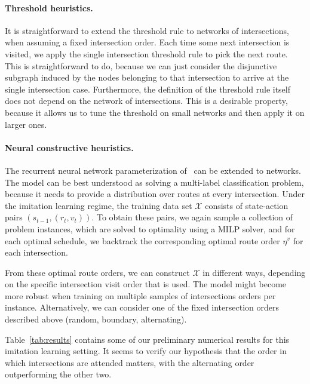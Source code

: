 \documentclass{report}
\theoremstyle{definition}
\theoremstyle{plain}
\begin{document}
\paragraph{Threshold heuristics.}
It is straightforward to extend the threshold rule to networks of
intersections, when assuming a fixed intersection order. Each time some
next intersection is visited, we apply the single intersection threshold rule to
pick the next route. This is straightforward to do, because we can just consider
the disjunctive subgraph induced by the nodes belonging to that intersection to
arrive at the single intersection case.
%
Furthermore, the definition of the threshold rule itself does not depend on the
network of intersections. This is a desirable property, because it allows us to
tune the threshold on small networks and then apply it on larger ones.

\paragraph{Neural constructive heuristics.}

The recurrent neural network parameterization of~ can be extended to
networks.
%
The model can be best understood as solving a multi-label classification
problem, because it needs to provide a distribution over routes at every
intersection.
%
Under the imitation learning regime, the training data set $\mathcal{X}$
consists of state-action pairs $(s_{t-1}, (r_{t}, v_{t}))$.
%
To obtain these pairs, we again sample a collection of problem instances, which
are solved to optimality using a MILP solver, and for each optimal schedule, we
backtrack the corresponding optimal route order $\eta^{v}$ for each
intersection.

From these optimal route orders, we can construct $\mathcal{X}$ in different
ways, depending on the specific intersection visit order that is used.
The model might become more robust when training on multiple samples of
intersections orders per instance.
Alternatively, we can consider one of the fixed intersection orders described
above (random, boundary, alternating).

Table~\ref{tab:results} contains some of our preliminary numerical results for
this imitation learning setting. It seems to verify our hypothesis that the
order in which intersections are attended matters, with the alternating order
outperforming the other two.
\end{document}
